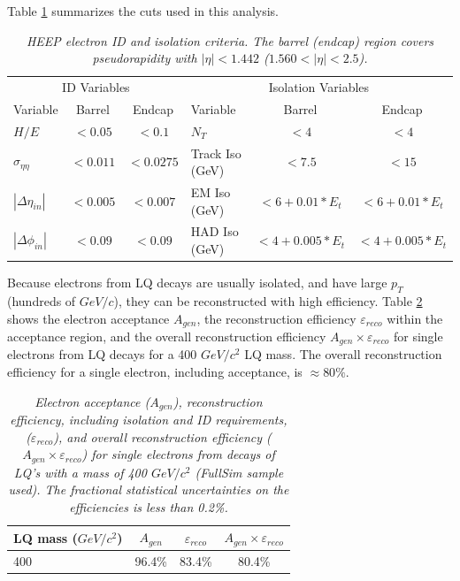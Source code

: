 \documentclass{cmspaper}
\begin{document}
\begin{linenumbers}
Table \ref{tab:HEEPselection} 
summarizes the cuts  
used in this analysis. 

\begin{table}[htbp]
  \label{tab:HEEPselection}
  \begin{center}
    \begin{tabular}{|lcc|lcc|} \hline
      \multicolumn{3}{|c|}{ID Variables} & \multicolumn{3}{|c|}{Isolation Variables} \\ 
      Variable & Barrel & Endcap & Variable & Barrel & Endcap  \\ \hline
      $H/E$  & $<0.05$ & $<0.1$ & $N_T$  & $<4$ & $<4$ \\ \hline
      $\sigma_{\eta\eta}$  & $<0.011$ & $<0.0275$ & Track Iso (GeV) & $<7.5$ & $<15$ \\ \hline
      $|\Delta\eta_{in}|$  & $<0.005$ & $<0.007$ & EM Iso (GeV) & $<6+0.01*E_{t}$ & $<6+0.01*E_{t}$ \\ \hline
      $|\Delta\phi_{in}|$  & $<0.09$ & $<0.09$ & HAD Iso (GeV) & $<4+0.005*E_{t}$ & $<4+0.005*E_{t}$ \\ \hline
    \end{tabular}
  \caption{\small \sl HEEP electron ID and isolation criteria.  The 
    barrel (endcap) region covers pseudorapidity with  
$|\eta|<1.442$ ($1.560<|\eta|<2.5$).}
  \end{center}
\end{table}

Because electrons from LQ decays are usually isolated, and have 
large $p_{T}$  
(hundreds of $GeV/c$), they can be reconstructed with high efficiency. 
Table \ref{tab:ElecEffAcc} 
shows the electron acceptance $A_{gen}$,
the reconstruction efficiency $\varepsilon_{reco}$ within the acceptance 
region, and the overall reconstruction efficiency $A_{gen} \times \varepsilon_{reco}$ 
for single electrons from LQ decays for a 400 $GeV/c^2$ LQ mass.
The overall reconstruction efficiency for a single electron, including acceptance, is $\approx 80\%$.
\begin{table}[htb]
  \label{tab:ElecEffAcc}
  \begin{center}
    \begin{tabular}{|l|c|c|c|} \hline
      LQ mass ($GeV/c^2$) & $A_{gen}$ & $\varepsilon_{reco}$ & $A_{gen} \times \varepsilon_{reco}$\\ \hline
      400 & 96.4\% & 83.4\% & 80.4\% \\ \hline
    \end{tabular}
    \caption{\small \sl Electron acceptance ($A_{gen}$), 
      reconstruction efficiency, including isolation and ID requirements, 
($\varepsilon_{reco}$), and overall reconstruction efficiency 
      ($A_{gen} \times \varepsilon_{reco}$) for single electrons from decays 
of LQ's with a mass of 400 $GeV/c^2$ (FullSim sample used).   
      The fractional statistical uncertainties on the efficiencies is 
less than 0.2\%.  
      } 
  \end{center}
\end{table}


\end{linenumbers}
\end{document}
